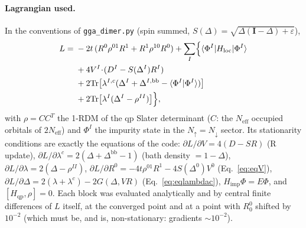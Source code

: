 \documentclass[11pt]{article}
\newcommand{\Neff}{N_{\mathrm{eff}}}
\newcommand{\Hqp}{H_{\mathrm{qp}}}
\newcommand{\Hloc}{H_{\mathrm{loc}}}
\begin{document}
\paragraph{Lagrangian used.} In the conventions of \texttt{gga\_dimer.py} (spin
summed, $S(\Delta)=\sqrt{\Delta(\mathbf I-\Delta)+\varepsilon}$),
\begin{equation}
  \begin{split}
  L ={}& -2t\,(R^{0}\rho^{01}R^{1}+R^{1}\rho^{10}R^{0})
  + \sum_I\Bigl\{\langle\Phi^I|\Hloc|\Phi^I\rangle \\
  & + 4V^I\!\cdot\!(D^I-S(\Delta^I)R^I) \\
  & + 2\mathrm{Tr}\bigl[\lambda^{I,c}(\Delta^I+\Delta^{I,\mathrm{bb}}-\langle\Phi^I|\Phi^I\rangle)\bigr] \\
  & + 2\mathrm{Tr}\bigl[\lambda^{I}(\Delta^I-\rho^{II})\bigr]\Bigr\},
  \end{split}
  \label{eq:Lcode}
\end{equation}
with $\rho=CC^{T}$ the 1-RDM of the qp Slater determinant ($C$: the $\Neff$
occupied orbitals of $2\Neff$) and $\Phi^I$ the impurity state in the
$N_\uparrow=N_\downarrow$ sector. Its stationarity conditions are exactly the equations
of the code: $\partial L/\partial V=4(D-SR)$ (R update),
$\partial L/\partial\lambda^{c}=2(\Delta+\Delta^{\mathrm{bb}}-1)$ (bath density
$=1-\Delta$), $\partial L/\partial\lambda=2(\Delta-\rho^{II})$,
$\partial L/\partial R^{0}=-4t\rho^{01}R^{1}-4S(\Delta^0)V^0$ (Eq.~\eqref{eq:eqV}),
$\partial L/\partial\Delta=2(\lambda+\lambda^{c})-2G(\Delta,VR)$ (Eq.~\eqref{eq:eqlambdac}),
$H_{\mathrm{imp}}\Phi=E\Phi$, and $[\Hqp,\rho]=0$. Each block was evaluated
analytically and by central finite differences of $L$ itself, at the converged
point and at a point with $R^0_0$ shifted by $10^{-2}$ (which must be, and is,
non-stationary: gradients $\sim10^{-2}$).
\end{document}
